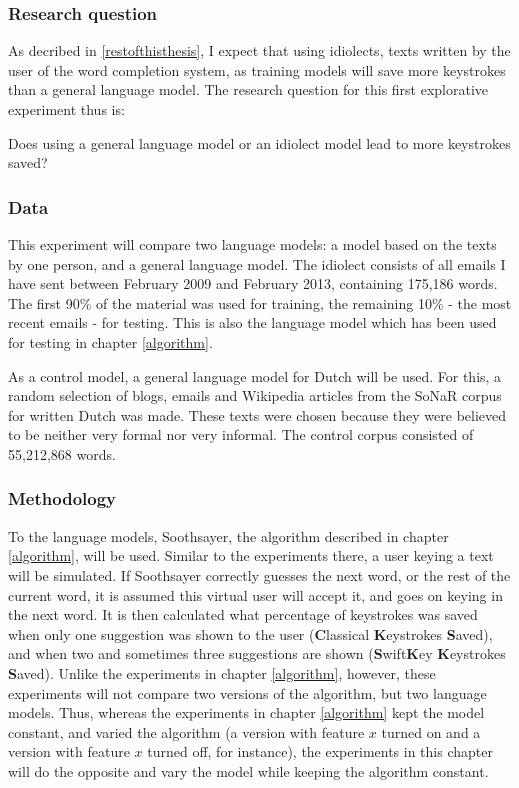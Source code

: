 \documentclass[12pt]{article}
\begin{document}
\subsubsection{Research question}
As decribed in \ref{restofthisthesis}, I expect that using idiolects, texts written by the user of the word completion system, as training models will save more keystrokes than a general language model. The research question for this first explorative experiment thus is:

\begin{examples}

\item Does using a general language model or an idiolect model lead to more keystrokes saved?

\end{examples}

\subsubsection{Data} \label{data_simple}
This experiment will compare two language models: a model based on the texts by one person, and a general language model. The idiolect consists of all emails I have sent between February 2009 and February 2013, containing 175,186 words. The first 90\% of the material was used for training, the remaining 10\% - the most recent emails - for testing. This is also the language model which has been used for testing in chapter \ref{algorithm}. 

As a control model, a general language model for Dutch will be used. For this, a random selection of blogs, emails and Wikipedia articles from the SoNaR corpus for written Dutch  was made. These texts were chosen because they were believed to be neither very formal nor very informal. The control corpus consisted of 55,212,868 words.


\subsubsection{Methodology}
To the language models, Soothsayer, the algorithm described in chapter \ref{algorithm}, will be used. Similar to the experiments there, a user keying a text will be simulated. If Soothsayer correctly guesses the next word, or the rest of the current word, it is assumed this virtual user will accept it, and goes on keying in the next word. It is then calculated what percentage of keystrokes was saved when only one suggestion was shown to the user (\textbf{C}lassical \textbf{K}eystrokes \textbf{S}aved), and when two and sometimes three suggestions are shown (\textbf{S}wift\textbf{K}ey \textbf{K}eystrokes \textbf{S}aved). Unlike the experiments in chapter \ref{algorithm}, however, these experiments will not compare two versions of the algorithm, but two language models. Thus, whereas the experiments in chapter \ref{algorithm} kept the model constant, and varied the algorithm (a version with feature $x$ turned on and a version with feature $x$ turned off, for instance), the experiments in this chapter will do the opposite and vary the model while keeping the algorithm constant. 
\end{document}
